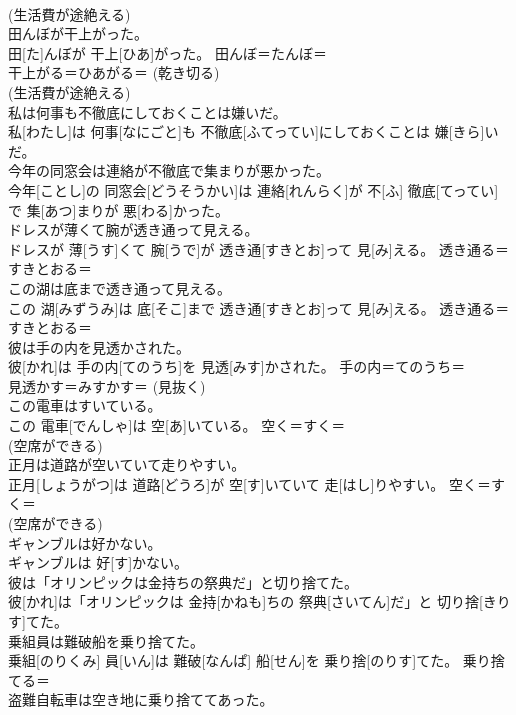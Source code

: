 \documentclass[8pt]{extreport}
\begin{document}
\begin{CJK}{UTF8}{min}
{\\	(生活費が途絶える)
\\	田んぼが干上がった。	
\\	田[た]んぼが 干上[ひあ]がった。	田んぼ＝たんぼ＝ 
\\	干上がる＝ひあがる＝ (乾き切る) 
\\	(生活費が途絶える)
\\	私は何事も不徹底にしておくことは嫌いだ。	
\\	私[わたし]は 何事[なにごと]も 不徹底[ふてってい]にしておくことは 嫌[きら]いだ。	
\\	今年の同窓会は連絡が不徹底で集まりが悪かった。	
\\	今年[ことし]の 同窓会[どうそうかい]は 連絡[れんらく]が 不[ふ] 徹底[てってい]で 集[あつ]まりが 悪[わる]かった。	
\\	ドレスが薄くて腕が透き通って見える。	
\\	ドレスが 薄[うす]くて 腕[うで]が 透き通[すきとお]って 見[み]える。	透き通る＝すきとおる＝ 
\\	この湖は底まで透き通って見える。	
\\	この 湖[みずうみ]は 底[そこ]まで 透き通[すきとお]って 見[み]える。	透き通る＝すきとおる＝ 
\\	彼は手の内を見透かされた。	
\\	彼[かれ]は 手の内[てのうち]を 見透[みす]かされた。	手の内＝てのうち＝ 
\\	見透かす＝みすかす＝ (見抜く)
\\	この電車はすいている。	
\\	この 電車[でんしゃ]は 空[あ]いている。	空く＝すく＝ 
\\	(空席ができる) 
\\	正月は道路が空いていて走りやすい。	
\\	正月[しょうがつ]は 道路[どうろ]が 空[す]いていて 走[はし]りやすい。	空く＝すく＝ 
\\	(空席ができる) 
\\	ギャンブルは好かない。	
\\	ギャンブルは 好[す]かない。	
\\	彼は「オリンピックは金持ちの祭典だ」と切り捨てた。	
\\	彼[かれ]は「オリンピックは 金持[かねも]ちの 祭典[さいてん]だ」と 切り捨[きりす]てた。	
\\	乗組員は難破船を乗り捨てた。	
\\	乗組[のりくみ] 員[いん]は 難破[なんぱ] 船[せん]を 乗り捨[のりす]てた。	乗り捨てる＝ 
\\	盗難自転車は空き地に乗り捨ててあった。	
}
\end{CJK}
\end{document}
